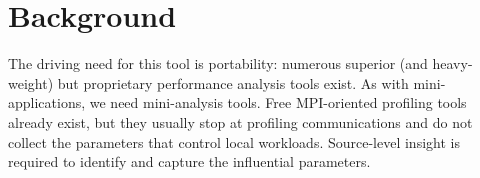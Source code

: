 
\chapter{Background}\label{sec:back}
The driving need for this tool is portability: numerous superior (and heavy-weight) but proprietary performance analysis tools exist. As with mini-applications, we need mini-analysis tools.
Free MPI-oriented profiling tools already exist, but they usually stop at profiling communications and do not collect the parameters that control local workloads. Source-level insight is required to identify and capture the influential parameters.

